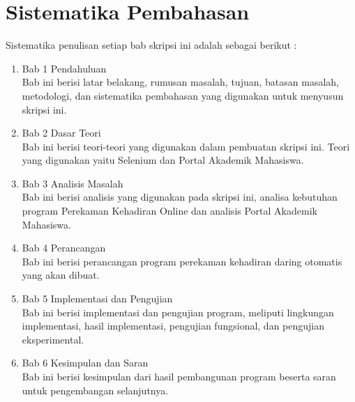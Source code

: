 \section{Sistematika Pembahasan}
\label{sec:sispem}
Sistematika penulisan setiap bab skripsi ini adalah sebagai berikut :
\begin{enumerate}
	\item Bab 1 Pendahuluan \\
	Bab ini berisi latar belakang, rumusan masalah, tujuan, batasan masalah, metodologi, dan sistematika pembahasan yang digunakan untuk menyusun skripsi ini.
	\item Bab 2 Dasar Teori \\
	Bab ini berisi teori-teori yang digunakan dalam pembuatan skripsi ini. Teori yang digunakan yaitu Selenium dan Portal Akademik Mahasiswa.
	\item Bab 3 Analisis Masalah \\
	Bab ini berisi analisis yang digunakan pada skripsi ini, analisa kebutuhan program Perekaman Kehadiran Online dan analisis Portal Akademik Mahasiswa.
	\item Bab 4 Perancangan \\
	Bab ini berisi perancangan program perekaman kehadiran daring otomatis yang akan dibuat.
	\item Bab 5 Implementasi dan Pengujian\\
	Bab ini berisi implementasi dan pengujian program, meliputi lingkungan implementasi, hasil implementasi, pengujian fungsional, dan pengujian eksperimental.
	\item Bab 6 Kesimpulan dan Saran \\
	Bab ini berisi kesimpulan dari hasil pembangunan program beserta saran untuk pengembangan selanjutnya.
\end{enumerate}
